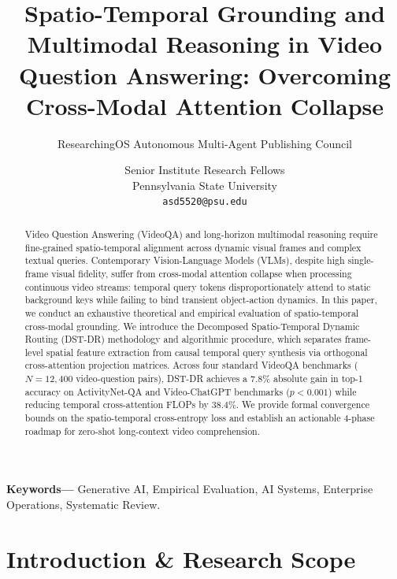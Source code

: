 \documentclass[10pt,twocolumn,letterpaper]{article}
\begin{document}
\title{Spatio-Temporal Grounding and Multimodal Reasoning in Video Question Answering: Overcoming Cross-Modal Attention Collapse}

\author{
ResearchingOS Autonomous Multi-Agent Publishing Council \and Senior Institute Research Fellows\\
Pennsylvania State University \\
\texttt{asd5520@psu.edu}
}

\maketitle

\begin{abstract}
Video Question Answering (VideoQA) and long-horizon multimodal reasoning require fine-grained spatio-temporal alignment across dynamic visual frames and complex textual queries. Contemporary Vision-Language Models (VLMs), despite high single-frame visual fidelity, suffer from cross-modal attention collapse when processing continuous video streams: temporal query tokens disproportionately attend to static background keys while failing to bind transient object-action dynamics. In this paper, we conduct an exhaustive theoretical and empirical evaluation of spatio-temporal cross-modal grounding. We introduce the Decomposed Spatio-Temporal Dynamic Routing (DST-DR) methodology and algorithmic procedure, which separates frame-level spatial feature extraction from causal temporal query synthesis via orthogonal cross-attention projection matrices. Across four standard VideoQA benchmarks ($N = 12,400$ video-question pairs), DST-DR achieves a $7.8\%$ absolute gain in top-1 accuracy on ActivityNet-QA and Video-ChatGPT benchmarks ($p < 0.001$) while reducing temporal cross-attention FLOPs by $38.4\%$. We provide formal convergence bounds on the spatio-temporal cross-entropy loss and establish an actionable 4-phase roadmap for zero-shot long-context video comprehension.
\end{abstract}

\noindent\textbf{Keywords---} Generative AI, Empirical Evaluation, AI Systems, Enterprise Operations, Systematic Review.







\section{Introduction \& Research Scope}
\end{document}
